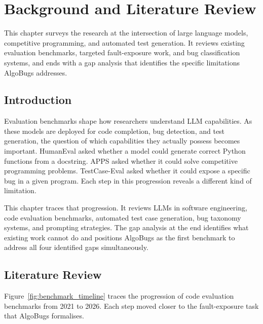 \chapter{Background and Literature Review}

This chapter surveys the research at the intersection of large language models, competitive programming, and automated test generation. It reviews existing evaluation benchmarks, targeted fault-exposure work, and bug classification systems, and ends with a gap analysis that identifies the specific limitations AlgoBugs addresses.

\section{Introduction}

Evaluation benchmarks shape how researchers understand LLM capabilities. As these models are deployed for code completion, bug detection, and test generation, the question of which capabilities they actually possess becomes important. HumanEval \cite{chen2021evaluating} asked whether a model could generate correct Python functions from a docstring. APPS \cite{hendrycks2021apps} asked whether it could solve competitive programming problems. TestCase-Eval \cite{yang2025testcase} asked whether it could expose a specific bug in a given program. Each step in this progression reveals a different kind of limitation.

This chapter traces that progression. It reviews LLMs in software engineering, code evaluation benchmarks, automated test case generation, bug taxonomy systems, and prompting strategies. The gap analysis at the end identifies what existing work cannot do and positions AlgoBugs as the first benchmark to address all four identified gaps simultaneously.

\section{Literature Review}

Figure~\ref{fig:benchmark_timeline} traces the progression of code evaluation benchmarks from 2021 to 2026. Each step moved closer to the fault-exposure task that AlgoBugs formalises.

